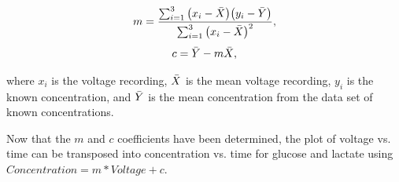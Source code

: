 \begin{equation}
    m = \frac{ \sum_{i=1}^{3} \big( x_{i} - \Bar{X} \big) \big( y_{i} - \Bar{Y} \big) }{ \sum_{i=1}^{3} \big( x_{i} - \Bar{X} \big)^{2} },
    \label{equation: least squares regression}
\end{equation}
\begin{equation}
    c = \Bar{Y} - m\Bar{X},
\end{equation}

\noindent where $x_{i}$ is the voltage recording, $\Bar{X}$ is the mean voltage recording, $y_i$ is the known concentration, and $\Bar{Y}$ is the mean concentration from the data set of known concentrations. 

Now that the $m$ and $c$ coefficients have been determined, the plot of voltage vs. time can be transposed into concentration vs. time for glucose and lactate using $Concentration = m*Voltage + c$.


